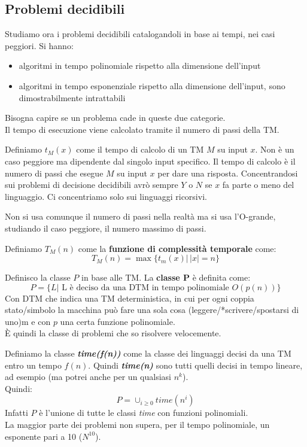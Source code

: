 \documentclass[a4paper,12pt, oneside]{book}
\begin{document}
\subsection{Problemi decidibili}
Studiamo ora i problemi decidibili catalogandoli in base ai tempi, nei casi
peggiori. Si hanno: 
\begin{itemize}
  \item algoritmi in tempo polinomiale rispetto alla dimensione dell'input
  \item algoritmi in tempo esponenziale rispetto alla dimensione dell'input,
  sono dimostrabilmente intrattabili
\end{itemize}
Bisogna capire se un problema cade in queste due categorie.\\
Il tempo di esecuzione viene calcolato tramite il numero di passi della TM.
\begin{definizione}
  Definiamo $t_M(x)$ come il tempo di calcolo di un TM $M$ su input $x$. Non è
  un caso peggiore ma dipendente dal singolo input specifico. Il tempo di
  calcolo è il numero di passi che esegue $M$ su input $x$ per dare una
  risposta. Concentrandosi sui problemi di decisione decidibili avrò sempre $Y$
  o $N$ se $x$ fa parte o meno del linguaggio. Ci concentriamo solo sui
  linguaggi ricorsivi.
\end{definizione}
Non si usa comunque il numero di passi nella realtà ma si usa l'O-grande,
studiando il caso peggiore, il numero massimo di passi.
\begin{definizione}
  Definiamo $T_M(n)$ come la \textbf{funzione di complessità temporale} come:
  \[T_M(n)=\max\{t_m(x)|\,|x|=n\}\]
\end{definizione}
\begin{definizione}
  Definisco la classe $P$ in base alle TM. La \textbf{classe P} è definita come:
  \[P=\{L|\mbox{ L è deciso da una DTM in tempo polinomiale } O(p(n))\}\]
  Con DTM che indica una TM deterministica, in cui per ogni coppia stato/simbolo
  la macchina può fare una sola cosa (leggere/*scrivere/spostarsi di uno)m e con
  $p$ una certa funzione polinomiale.\\
  È quindi la classe di problemi che so risolvere velocemente.
\end{definizione}
\begin{definizione}
  Definiamo la classe \textbf{\textit{time(f(n))}} come la classe dei linguaggi
  decisi da una TM entro un tempo $f(n)$. Quindi \textbf{\textit{time(n)}} sono
  tutti quelli decisi in tempo lineare, ad esempio (ma potrei anche per un
  qualsiasi $n^k$).\\
  Quindi:
  \[P=\cup_{i\geq 0} time(n^i)\]
  Infatti $P$ è l'unione di tutte le classi \textit{time} con funzioni
  polinomiali. \\
  La maggior parte dei problemi non supera, per il tempo polinomiale, un
  esponente pari a 10 ($N^{10}$).
\end{definizione}
\end{document}
